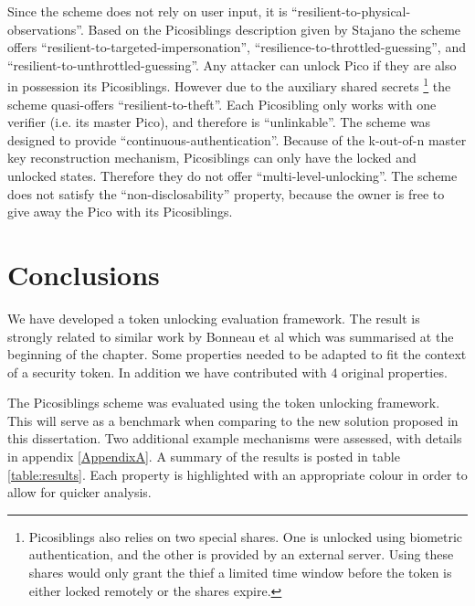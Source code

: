 %
Since the scheme does not rely on user input, it is ``resilient-to-physical-observations''. Based on the Picosiblings description given by Stajano \cite{stajano2011pico} the scheme offers ``resilient-to-targeted-impersonation'', ``resilience-to-throttled-guessing'', and ``resilient-to-unthrottled-guessing''. Any attacker can unlock Pico if they are also in possession its Picosiblings. However due to the auxiliary shared secrets \footnote{Picosiblings also relies on two special shares. One is unlocked using biometric authentication, and the other is provided by an external server. Using these shares would only grant the thief a limited time window before the token is either locked remotely or the shares expire.} the scheme quasi-offers ``resilient-to-theft''. Each Picosibling only works with one verifier (i.e. its master Pico), and therefore is ``unlinkable''. The scheme was designed to provide ``continuous-authentication''. Because of the k-out-of-n master key reconstruction mechanism, Picosiblings can only have the locked and unlocked states. Therefore they do not offer ``multi-level-unlocking''. The scheme does not satisfy the ``non-disclosability'' property, because the owner is free to give away the Pico with its Picosiblings.
	
\section{Conclusions}
We have developed a token unlocking evaluation framework. The result is strongly related to similar work by Bonneau et al \cite{bonneau2012quest} which was summarised at the beginning of the chapter. Some properties needed to be adapted to fit the context of a security token. In addition we have contributed with 4 original properties. 

The Picosiblings scheme was evaluated using the token unlocking framework. This will serve as a benchmark when comparing to the new solution proposed in this dissertation. Two additional example mechanisms were assessed, with details in appendix \ref{AppendixA}. A summary of the results is posted in table \ref{table:results}. Each property is highlighted with an appropriate colour in order to allow for quicker analysis.


